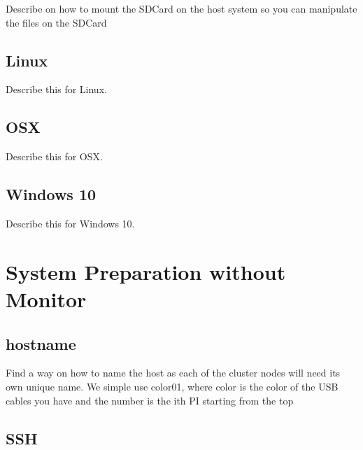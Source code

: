 \begin{exercise}
Describe on how to mount the SDCard on the host system so you can
manipulate the files on the SDCard
\end{exercise}

\subsection{Linux}


\begin{exercise}
Describe this for Linux.
\end{exercise}

\subsection{OSX}


\begin{exercise}
Describe this for OSX.
\end{exercise}


\subsection{Windows 10}

\begin{exercise}
Describe this for Windows 10.
\end{exercise}


\section{System Preparation without Monitor}


\subsection{hostname}

\begin{exercise}
Find a way on how to name the host as each of the cluster nodes will
need its own unique name. We simple use color01, where color is the
color of the USB cables you have and the number is the ith PI starting
from the top
\end{exercise}


\subsection{SSH}

